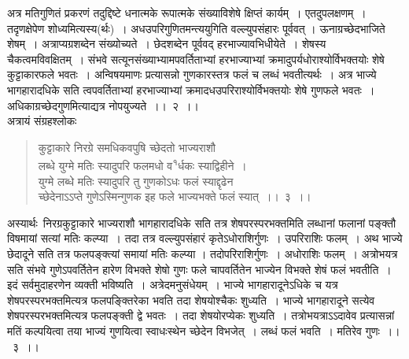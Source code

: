 \documentclass[11pt, openany]{book}
\begin{document}
\newpage
\thispagestyle{fancy}
\fancyhf{}
\noindent
अत्र मतिगुणितं प्रकरणं तदुद्दिष्टे धनात्मके रूपात्मके संख्याविशेषे क्षिप्तं कार्यम्~। एतदुपलक्षणम्~। तदृणक्षेपेण शोध्यमित्यस्य(र्थः)~। अधउपरिगुणितमन्त्ययुगिति वल्ल्युपसंहारः पूर्ववत् । ऊनाग्रच्छेदभाजिते शेषम्~। अत्राप्यग्रशब्देन संख्योच्यते~। छेदशब्देन पूर्ववद् हरभाज्यावभिधीयेते~। शेषस्य चैकत्वमविवक्षितम्~। संभवे सत्यूनसंख्याभ्यामपवर्तिताभ्यां हरभाज्याभ्यां क्रमादुपर्यधोराश्योर्विभक्तयोः शेषे कुट्टाकारफले भवतः~। अन्विषयमाणः प्रत्यासन्नो गुणकारस्तत्र फलं च लब्धं भवतीत्यर्थः~। अत्र भाज्ये भागहारादधिके सति त्वपवर्तिताभ्यां हरभाज्याभ्यां क्रमादधउपरिराश्योर्विभक्तयोः शेषे गुणफले भवतः~।अधिकाग्रच्छेदगुणमित्याद्यत्र नोपयुज्यते~।।~२~।।\\
\indent
अत्रायं संग्रहश्लोकः\textendash
\begin{quote}
{\ks कुट्टाकारे निरग्रे समधिकवपुषि च्छेदतो भाज्यराशौ\\
लब्धे युग्मे मतिः स्यादुपरि फलमधो व\textsuperscript{१}र्धकः स्याद्विहीने~।\\
युग्मे लब्धे मतिः स्यादुपरि तु गुणकोऽधः फलं स्याद्दृढेन\\
च्छेदेनाऽऽप्ते गुणेऽस्मिन्गुणक इह फले भाज्यभक्ते फलं स्यात्~।।~३~।।}
\end{quote}

\indent
अस्यार्थः\textendash\ निरग्रकुट्टाकारे भाज्यराशौ भागहारादधिके सति तत्र शेषपरस्परभक्तमिति लब्धानां फलानां पङ्क्तौ विषमायां सत्यां मतिः कल्प्या~। तदा तत्र वल्ल्युपसंहारं कृतेऽधोराशिर्गुणः~। उपरिराशिः फलम्~। अथ भाज्ये छेदादूने सति तत्र फलपङ्क्त्यां समायां मतिः कल्प्या । तदोपरिराशिर्गुणः~। अधोराशिः फलम्~। अत्रोभयत्र सति संभवे गुणेऽपवर्तितेन हारेण विभक्ते शेषो गुणः फले चापवर्तितेन भाज्येन विभक्ते शेषं फलं भवतीति~। इदं सर्वमुदाहरणेन व्यक्ती भविष्यति~। अत्रेदमनुसंधेयम्~। भाज्ये भागहारादूनेऽधिके च यत्र शेषपरस्परभक्तमित्यत्र फलपङ्क्तिरेका भवति तदा शेषयोश्चैकः शुध्यति~। भाज्ये भागहारादूने सत्येव शेषपरस्परभक्तमित्यत्र फलपङ्क्ती द्वे भवतः~। तदा शेषयोरप्येकः शुध्यति~। तत्रोभयत्राऽऽदावेव प्रत्यासन्नां मतिं कल्पयित्वा तया भाज्यं गुणयित्वा स्वाधःस्थेन च्छेदेन विभजेत्~। लब्धं फलं भवति~। मतिरेव गुणः~।।~३~।।

\end{document}
